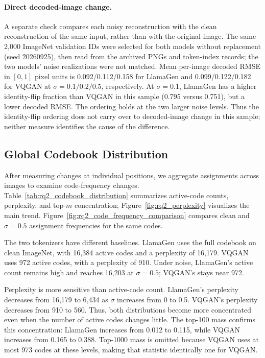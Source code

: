 \paragraph{Direct decoded-image change.}
A separate check compares each noisy reconstruction with the clean
reconstruction of the same input, rather than with the original image. The
same 2{,}000 ImageNet validation IDs were selected for both models
without replacement (seed 20260925), then read from the archived PNGs and
token-index records; the two models' noise realizations were not matched.
Mean per-image decoded RMSE in $[0,1]$ pixel units is
0.092/0.112/0.158 for LlamaGen and 0.099/0.122/0.182 for VQGAN at
$\sigma=0.1/0.2/0.5$, respectively. At $\sigma=0.1$, LlamaGen has a higher
identity-flip fraction than VQGAN in this sample (0.795 versus 0.751), but
a lower decoded RMSE. The ordering
holds at the two larger noise levels. Thus the
identity-flip ordering does not carry over to decoded-image change in this
sample; neither measure identifies the cause of the difference.
\subsection{Global Codebook Distribution}
\label{subsec:rq2_codebook_distribution}

After measuring changes at individual positions, we aggregate assignments
across images to examine code-frequency changes.
Table~\ref{tab:rq2_codebook_distribution} summarizes active-code counts,
perplexity, and top-$m$ concentration; Figure~\ref{fig:rq2_perplexity}
visualizes the main trend. Figure~\ref{fig:rq2_code_frequency_comparison}
compares clean and $\sigma=0.5$ assignment frequencies for the same codes.

The two tokenizers have different baselines. LlamaGen uses the full codebook on
clean ImageNet, with 16{,}384 active codes and a perplexity of 16{,}179. VQGAN
uses 972 active codes, with a perplexity of 910. Under noise, LlamaGen's active
count remains high and reaches 16{,}203 at $\sigma=0.5$; VQGAN's stays near 972.

Perplexity is more sensitive than active-code count. LlamaGen's perplexity decreases from 16{,}179 to 6{,}434 as $\sigma$ increases from 0 to 0.5. VQGAN's perplexity decreases from 910 to 560. Thus, both distributions become more concentrated even when the number of active codes changes little. The top-100 mass confirms this concentration: LlamaGen increases from 0.012 to 0.115, while VQGAN increases from 0.165 to 0.388. Top-1000 mass is omitted because VQGAN uses at most 973 codes at these levels, making that statistic identically one for VQGAN.

